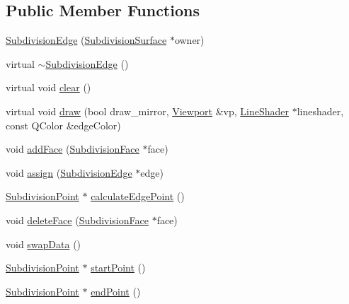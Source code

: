 \subsection*{Public Member Functions}
\begin{DoxyCompactItemize}
\item 
\hyperlink{classShipCADGeometry_1_1SubdivisionEdge_ab08271ed7f5d371f0495d8a7d2c96dae}{Subdivision\-Edge} (\hyperlink{classShipCADGeometry_1_1SubdivisionSurface}{Subdivision\-Surface} $\ast$owner)
\item 
virtual \hyperlink{classShipCADGeometry_1_1SubdivisionEdge_ac787ad1a0228f91038de9518ad217364}{$\sim$\-Subdivision\-Edge} ()
\item 
virtual void \hyperlink{classShipCADGeometry_1_1SubdivisionEdge_a08358ac65c2d710855b8b93c64ce9d02}{clear} ()
\item 
virtual void \hyperlink{classShipCADGeometry_1_1SubdivisionEdge_a26deda12672fa679b49b28f2371e728b}{draw} (bool draw\-\_\-mirror, \hyperlink{classShipCADGeometry_1_1Viewport}{Viewport} \&vp, \hyperlink{classShipCADGeometry_1_1LineShader}{Line\-Shader} $\ast$lineshader, const Q\-Color \&edge\-Color)
\item 
void \hyperlink{classShipCADGeometry_1_1SubdivisionEdge_a1b2e2b1d7e051d42250c0ad1f5eaa560}{add\-Face} (\hyperlink{classShipCADGeometry_1_1SubdivisionFace}{Subdivision\-Face} $\ast$face)
\item 
void \hyperlink{classShipCADGeometry_1_1SubdivisionEdge_ab91ca7bbcd013cc01e90b077ea1aae9b}{assign} (\hyperlink{classShipCADGeometry_1_1SubdivisionEdge}{Subdivision\-Edge} $\ast$edge)
\item 
\hyperlink{classShipCADGeometry_1_1SubdivisionPoint}{Subdivision\-Point} $\ast$ \hyperlink{classShipCADGeometry_1_1SubdivisionEdge_aa1bce1c13f4911839205e812cfd0f683}{calculate\-Edge\-Point} ()
\item 
void \hyperlink{classShipCADGeometry_1_1SubdivisionEdge_a1f4b70ab6d0c4dfec07a2d4348bc9a3e}{delete\-Face} (\hyperlink{classShipCADGeometry_1_1SubdivisionFace}{Subdivision\-Face} $\ast$face)
\item 
void \hyperlink{classShipCADGeometry_1_1SubdivisionEdge_ad19ddea08367fa2307e131132e36c008}{swap\-Data} ()
\item 
\hyperlink{classShipCADGeometry_1_1SubdivisionPoint}{Subdivision\-Point} $\ast$ \hyperlink{classShipCADGeometry_1_1SubdivisionEdge_a0d8b0bc79b1f8d19f2c4798251aeff31}{start\-Point} ()
\item 
\hyperlink{classShipCADGeometry_1_1SubdivisionPoint}{Subdivision\-Point} $\ast$ \hyperlink{classShipCADGeometry_1_1SubdivisionEdge_a6d98a4d163b1beae788038f36b5ee2fe}{end\-Point} ()

\end{DoxyCompactItemize}
